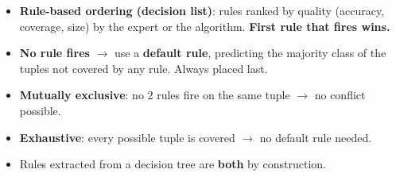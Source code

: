 {\begin{itemize}
        misclassification cost). All rules of one class come as a block.
  \item \textbf{Rule-based ordering (decision list)}: rules ranked by quality
        (accuracy, coverage, size) by the expert or the algorithm. \textbf{First rule that fires wins.}
  \item \textbf{No rule fires} $\rightarrow$ use a \textbf{default rule}, predicting the majority
        class of the tuples not covered by any rule. Always placed last.
\end{itemize}
\begin{itemize}
  \item \textbf{Mutually exclusive}: no 2 rules fire on the same tuple $\rightarrow$ no conflict possible.
  \item \textbf{Exhaustive}: every possible tuple is covered $\rightarrow$ no default rule needed.
  \item Rules extracted from a decision tree are \textbf{both} by construction.
\end{itemize}}

